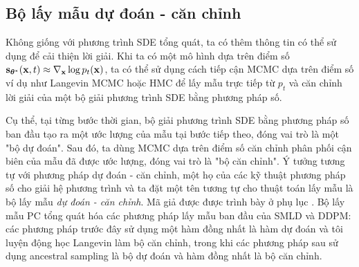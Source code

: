 \documentclass{article} %
\begin{document}
\subsection{Bộ lấy mẫu dự đoán - căn chỉnh}

Không giống với phương trình SDE tổng quát, ta có thêm thông tin có thể sử dụng để cải thiện lời giải.
Khi ta có một mô hình dựa trên điểm số $\bold{s}_{\boldsymbol{\theta}^{\ast}} (\bold{x}, t)\approx \nabla_{\bold{x}} \log p_t (\bold{x})$, ta có thể sử dụng cách tiếp cận MCMC dựa trên điểm số ví dụ như Langevin MCMC \citep{parisi1981correlation,grenander1994representations} hoặc HMC \citep{neal2011mcmc} để lấy mẫu trực tiếp từ $p_t$ và căn chỉnh lời giải của một bộ giải phương trình SDE bằng phương pháp số.

Cụ thể, tại từng bước thời gian, bộ giải phương trình SDE bằng phương pháp số ban đầu tạo ra một ước lượng của mẫu tại bước tiếp theo, đóng vai trò là một "bộ dự đoán".
Sau đó, ta dùng MCMC dựa trên điểm số căn chỉnh phân phối cận biên của mẫu đã được ước lượng, đóng vai trò là "bộ căn chỉnh".
Ý tưởng tương tự với phương pháp dự đoán - căn chỉnh, một họ của các kỹ thuật phương pháp số cho giải hệ phương trình \citep{allgower2012numerical} và ta đặt một tên tương tự cho thuật toán lấy mẫu là bộ lấy mẫu \textit{dự đoán - căn chỉnh}.
Mã giả được được trình bày ở phụ lục .
Bộ lấy mẫu PC tổng quát hóa các phương pháp lấy mẫu ban đầu của SMLD và DDPM: các phương pháp trước đây sử dụng một hàm đồng nhất là hàm dự đoán và tôi luyện động học Langevin làm bộ căn chỉnh, trong khi các phương pháp sau sử dụng ancestral sampling là bộ dự đoán và hàm đồng nhất là bộ căn chỉnh.
\end{document}
